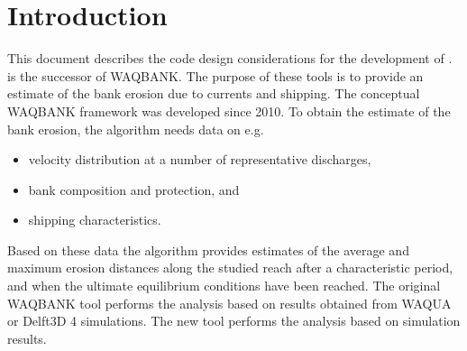 \chapter{Introduction}

This document describes the code design considerations for the development of \dfastbe.
\dfastbe is the successor of WAQBANK.
The purpose of these tools is to provide an estimate of the bank erosion due to currents and shipping.
The conceptual WAQBANK framework was developed since 2010.
To obtain the estimate of the bank erosion, the algorithm needs data on e.g.

\begin{itemize}
\item velocity distribution at a number of representative discharges,
\item bank composition and protection, and
\item shipping characteristics.
\end{itemize}

Based on these data the algorithm provides estimates of the average and maximum erosion distances along the studied reach after a characteristic period, and when the ultimate equilibrium conditions have been reached.
The original WAQBANK tool performs the analysis based on results obtained from WAQUA or Delft3D 4 simulations.
The new \dfastbe tool performs the analysis based on \dflowfm simulation results.